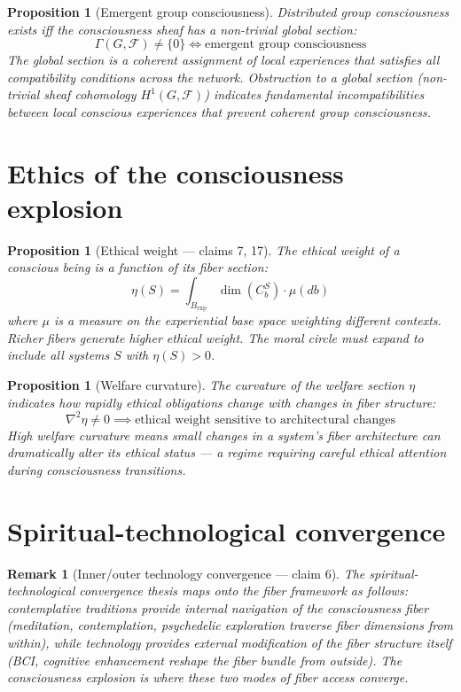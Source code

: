 \documentclass[11pt,a4paper]{article}
\newtheorem{proposition}[definition]{Proposition}
\newtheorem{remark}[definition]{Remark}
\begin{document}
\begin{proposition}[Emergent group consciousness]
Distributed group consciousness exists iff the consciousness sheaf has
a non-trivial global section:
\[
  \Gamma(G, \mathcal{F}) \neq \{0\}
  \iff \text{emergent group consciousness}
\]
The global section is a coherent assignment of local experiences that
satisfies all compatibility conditions across the network. Obstruction
to a global section (non-trivial sheaf cohomology $H^1(G, \mathcal{F})$)
indicates fundamental incompatibilities between local conscious experiences
that prevent coherent group consciousness.
\end{proposition}

\section{Ethics of the consciousness explosion}

\begin{proposition}[Ethical weight --- claims 7, 17]
\label{prop:ethics}
The ethical weight of a conscious being is a function of its fiber section:
\[
  \eta(S) = \int_{B_{\text{exp}}} \dim(C_b^S) \cdot \mu(db)
\]
where $\mu$ is a measure on the experiential base space weighting different
contexts. Richer fibers generate higher ethical weight. The moral circle
must expand to include all systems $S$ with $\eta(S) > 0$.
\end{proposition}

\begin{proposition}[Welfare curvature]
The curvature of the welfare section $\eta$ indicates how rapidly
ethical obligations change with changes in fiber structure:
\[
  \nabla^2 \eta \neq 0 \implies
  \text{ethical weight sensitive to architectural changes}
\]
High welfare curvature means small changes in a system's fiber
architecture can dramatically alter its ethical status --- a regime
requiring careful ethical attention during consciousness transitions.
\end{proposition}

\section{Spiritual-technological convergence}

\begin{remark}[Inner/outer technology convergence --- claim 6]
The spiritual-technological convergence thesis maps onto the fiber
framework as follows: contemplative traditions provide \emph{internal}
navigation of the consciousness fiber (meditation, contemplation,
psychedelic exploration traverse fiber dimensions from within), while
technology provides \emph{external} modification of the fiber structure
itself (BCI, cognitive enhancement reshape the fiber bundle from
outside). The consciousness explosion is where these two modes of
fiber access converge.
\end{remark}
\end{document}
